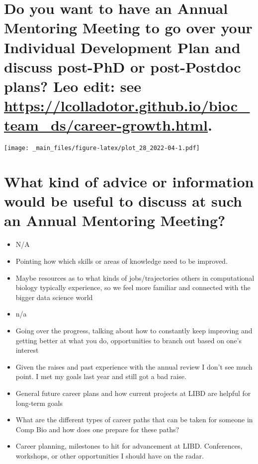 \documentclass[
]{book}
\providecommand{\tightlist}{%
  \setlength{\itemsep}{0pt}\setlength{\parskip}{0pt}}
\begin{document}
\hypertarget{do-you-want-to-have-an-annual-mentoring-meeting-to-go-over-your-individual-development-plan-and-discuss-post-phd-or-post-postdoc-plans-leo-edit-see-httpslcolladotor.github.iobioc_team_dscareer-growth.html.}{%
\section{\texorpdfstring{Do you want to have an Annual Mentoring Meeting to go over your Individual Development Plan and discuss post-PhD or post-Postdoc plans? Leo edit: see \url{https://lcolladotor.github.io/bioc_team_ds/career-growth.html}.}{Do you want to have an Annual Mentoring Meeting to go over your Individual Development Plan and discuss post-PhD or post-Postdoc plans? Leo edit: see https://lcolladotor.github.io/bioc\_team\_ds/career-growth.html.}}\label{do-you-want-to-have-an-annual-mentoring-meeting-to-go-over-your-individual-development-plan-and-discuss-post-phd-or-post-postdoc-plans-leo-edit-see-httpslcolladotor.github.iobioc_team_dscareer-growth.html.}}

\texttt{[image: \_main\_files/figure-latex/plot\_28\_2022-04-1.pdf]}

\hypertarget{what-kind-of-advice-or-information-would-be-useful-to-discuss-at-such-an-annual-mentoring-meeting}{%
\section{What kind of advice or information would be useful to discuss at such an Annual Mentoring Meeting?}\label{what-kind-of-advice-or-information-would-be-useful-to-discuss-at-such-an-annual-mentoring-meeting}}

\begin{itemize}
\tightlist
\item
  N/A
\item
  Pointing how which skills or areas of knowledge need to be improved.
\item
  Maybe resources as to what kinds of jobs/trajectories others in computational biology typically experience, so we feel more familiar and connected with the bigger data science world
\item
  n/a
\item
  Going over the progress, talking about how to constantly keep improving and getting better at what you do, opportunities to branch out based on one's interest
\item
  Given the raises and past experience with the annual review I don't see much point. I met my goals last year and still got a bad raise.
\item
  General future career plans and how current projects at LIBD are helpful for long-term goals
\item
  What are the different types of career paths that can be taken for someone in Comp Bio and how does one prepare for these paths?
\item
  Career planning, milestones to hit for advancement at LIBD. Conferences, workshops, or other opportunities I should have on the radar.
\end{itemize}
\end{document}
